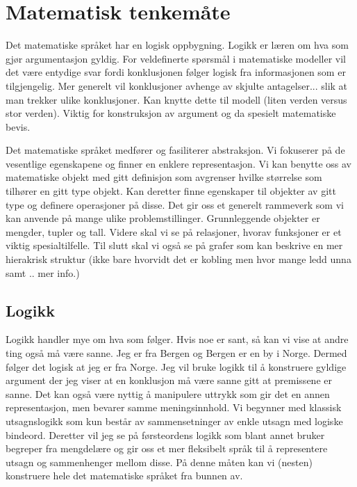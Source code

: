 \chapter{Matematisk tenkemåte}
Det matematiske språket har en logisk oppbygning. Logikk er læren om hva som gjør argumentasjon gyldig. For veldefinerte spørsmål i matematiske modeller vil det være entydige svar fordi konklusjonen følger logisk fra informasjonen som er tilgjengelig. Mer generelt vil konklusjoner avhenge av skjulte antagelser... slik at man trekker ulike konklusjoner. Kan knytte dette til modell (liten verden versus stor verden). Viktig for konstruksjon av argument og da spesielt matematiske bevis. 

Det matematiske språket medfører og fasiliterer abstraksjon. Vi fokuserer på de vesentlige egenskapene og finner en enklere representasjon. Vi kan benytte oss av matematiske objekt med gitt definisjon som avgrenser hvilke størrelse som tilhører en gitt type objekt. Kan deretter finne egenskaper til objekter av gitt type og definere operasjoner på disse. Det gir oss et generelt rammeverk som vi kan anvende på mange ulike problemstillinger. Grunnleggende objekter er mengder, tupler og tall. Videre skal vi se på relasjoner, hvorav funksjoner er et viktig spesialtilfelle. Til slutt skal vi også se på grafer som kan beskrive en mer hierakrisk struktur (ikke bare hvorvidt det er kobling men hvor mange ledd unna samt .. mer info.)
\section{Logikk}
Logikk handler mye om hva som følger. Hvis noe er sant, så kan vi vise at andre ting også må være sanne. Jeg er fra Bergen og Bergen er en by i Norge. Dermed følger det logisk at jeg er fra Norge. Jeg vil bruke logikk til å konstruere gyldige argument der jeg viser at en konklusjon må være sanne gitt at premissene er sanne. Det kan også være nyttig å manipulere uttrykk som gir det en annen representasjon, men bevarer samme meningsinnhold. Vi begynner med klassisk utsagnslogikk som kun består av sammensetninger av enkle utsagn med logiske bindeord. Deretter vil jeg se på førsteordens logikk som blant annet bruker begreper fra mengdelære og gir oss et mer fleksibelt språk til å representere utsagn og sammenhenger mellom disse. På denne måten kan vi (nesten) konstruere hele det matematiske språket fra bunnen av.
